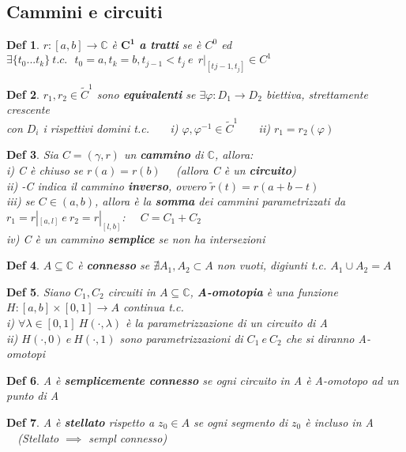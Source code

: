 \documentclass{article}
\theoremstyle{unnumbered}
\newtheorem* {theoremT}{Def}
\theoremstyle{unnumbered1}
\newenvironment{defi}{\begin{gBox}\begin{theoremT}}{\end{theoremT}\end{gBox}}
\renewcommand{\phi}{\varphi}
\begin{document}
\subsection{Cammini e circuiti}
%
\begin{defi}$r:[a,b]\rightarrow \mathbb{C}$ è $\mathbf{C^1}$ \textbf{a tratti} se è $C^0$ ed $\exists \{t_0...t_k\}\ t.c.\ \ \ t_0=a, t_k=b, t_{j-1}<t_j\ e\ \ r|_{[t_{}j-1,t_j]} \in C^1$
\end{defi}
%
\begin{defi}$r_1,r_2 \in \widetilde{C}^1$ sono \textbf{equivalenti} se $\exists\phi:D_1\rightarrow D_2$ biettiva, strettamente crescente\\ con $D_i$ i rispettivi domini t.c. \ \ \ i) $\phi,\phi^{-1}\in \widetilde{C}^1$ \ \ \ ii) $r_1=r_2(\phi)$
\end{defi}
%
\begin{defi}Sia $C=(\gamma,{r})$ un \textbf{cammino} di $\mathbb{C}$, allora: \\
i) C è chiuso se $r(a)=r(b)$ \ \ (allora C è un \textbf{circuito})\\
ii) -C indica il cammino \textbf{inverso}, ovvero $\widetilde{r}(t)=r(a+b-t)$\\
iii) se $C\in(a,b)$, allora è la \textbf{somma} dei cammini parametrizzati da $r_1=r|_{[a,l]} \ e \ r_2=r|_{[l,b]}$: \ \ $C=C_1+C_2$\\
iv) C è un cammino \textbf{semplice} se non ha intersezioni
\end{defi}
%
\begin{defi}$A\subseteq\mathbb{C}$ è \textbf{connesso} se $\nexists A_1,A_2\subset A$ non vuoti, digiunti t.c. $A_1\cup A_2=A$ %
\end{defi}
%
\begin{defi}Siano $ C_1,C_2$ circuiti in $A\subseteq\mathbb{C}$, \textbf{A-omotopia} è una funzione $H:[a,b]\times[0,1]\rightarrow A$ continua t.c. \\ i) $\forall \lambda \in [0,1] \ H(\cdot,\lambda)$ è la parametrizzazione di un circuito di A \\ ii) $H(\cdot,0) \ e \ H(\cdot,1) $ sono parametrizzazioni di $C_1 \ e \ C_2$ che si diranno A-omotopi
\end{defi}
%
\begin{defi}A è \textbf{semplicemente connesso} se ogni circuito in A è A-omotopo ad un punto di A
\end{defi}
%
\begin{defi}A è \textbf{stellato} rispetto a $z_0\in A$ se ogni segmento di $z_0$ è incluso in A \ \ (Stellato $\implies$ sempl connesso)
\end{defi}
\end{document}
